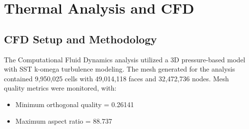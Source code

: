 \section{Thermal Analysis and CFD}

\subsection{CFD Setup and Methodology}

The Computational Fluid Dynamics analysis utilized a 3D pressure-based model with SST k-omega turbulence modeling. The mesh generated for the analysis contained 9,950,025 cells with 49,014,118 faces and 32,472,736 nodes. Mesh quality metrics were monitored, with:
\begin{itemize}
    \item Minimum orthogonal quality = 0.26141
    \item Maximum aspect ratio = 88.737
\end{itemize}

